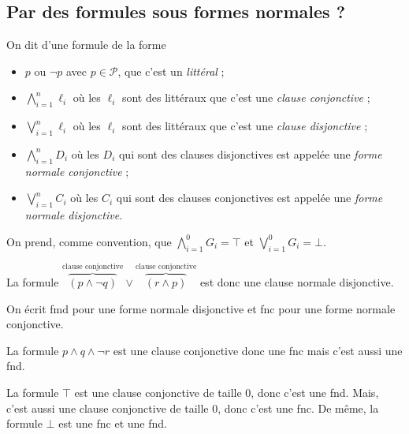 \subsection{Par des formules sous formes normales ?}

\begin{defn}
	On dit d'une formule de la forme
	\begin{itemize}
		\item $p$\/ ou $\lnot p$\/ avec $p \in \mathcal{P}$, que c'est un {\it littéral}\/ ;
		\item $\bigwedge_{i=1}^n \ell_i$\/ où les $\ell_i$\/ sont des littéraux que c'est une {\it clause conjonctive}\/ ;
		\item $\bigvee_{i=1}^n \ell_i$\/ où les $\ell_i$\/ sont des littéraux que c'est une {\it clause disjonctive}\/ ;
		\item $\bigwedge_{i=1}^n D_i$\/ où les $D_i$\/ qui sont des clauses disjonctives est appelée une {\it forme normale conjonctive}\/ ;
		\item $\bigvee_{i=1}^n C_i$\/ où les $C_i$\/ qui sont des clauses conjonctives est appelée une {\it forme normale disjonctive}.
	\end{itemize}
	 
	 
\end{defn}

\begin{rmk}
	On prend, comme convention, que $\bigwedge_{i=1}^0 G_i = \top$\/ et $\bigvee_{i=1}^0 G_i = \bot$.
\end{rmk}

\begin{exm}
	La formule $\overbrace{(p \land \lnot q)}^{\text{clause conjonctive}} \lor \overbrace{(r \land p)}^{\text{clause conjonctive}}$\/ est donc une clause normale disjonctive.
\end{exm}

\begin{rmk}
	On écrit {\sc fmd}\/ pour une forme normale disjonctive et {\sc fnc}\/ pour une forme normale conjonctive.
\end{rmk}

\begin{exm}
	La formule $p \land q \land\lnot r$\/ est une clause conjonctive donc une {\sc fnc}\/ mais c'est aussi une {\sc fnd}.
\end{exm}

\begin{exm}
	La formule $\top $\/ est une clause conjonctive de taille 0, donc c'est une {\sc fnd}. Mais, c'est aussi une clause conjonctive de taille 0, donc c'est une {\sc fnc}. De même, la formule $\bot$\/ est une {\sc fnc}\/ et une {\sc fnd}.
\end{exm}

